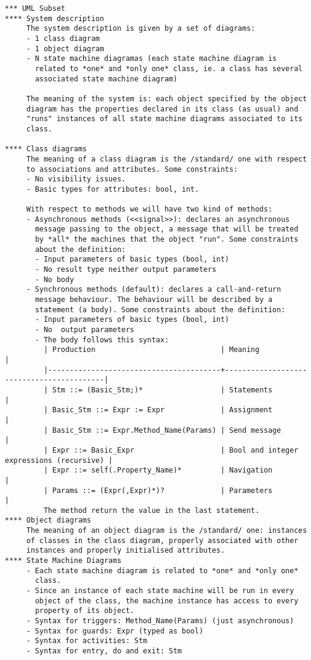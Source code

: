 \cite{Dobing:2006:UU:1125944.1125949}

\begin{verbatim}
*** UML Subset
**** System description
     The system description is given by a set of diagrams:
     - 1 class diagram
     - 1 object diagram
     - N state machine diagramas (each state machine diagram is
       related to *one* and *only one* class, ie. a class has several
       associated state machine diagram)

     The meaning of the system is: each object specified by the object
     diagram has the properties declared in its class (as usual) and
     "runs" instances of all state machine diagrams associated to its
     class.

**** Class diagrams
     The meaning of a class diagram is the /standard/ one with respect
     to associations and attributes. Some constraints:
     - No visibility issues.
     - Basic types for attributes: bool, int.

     With respect to methods we will have two kind of methods:
     - Asynchronous methods (<<signal>>): declares an asynchronous
       message passing to the object, a message that will be treated
       by *all* the machines that the object "run". Some constraints
       about the definition:
       - Input parameters of basic types (bool, int)
       - No result type neither output parameters
       - No body
     - Synchronous methods (default): declares a call-and-return
       message behaviour. The behaviour will be described by a
       statement (a body). Some constraints about the definition:
       - Input parameters of basic types (bool, int)
       - No  output parameters
       - The body follows this syntax:
         | Production                             | Meaning                                  |
         |----------------------------------------+------------------------------------------|
         | Stm ::= (Basic_Stm;)*                  | Statements                               |
         | Basic_Stm ::= Expr := Expr             | Assignment                               |
         | Basic_Stm ::= Expr.Method_Name(Params) | Send message                             |
         | Expr ::= Basic_Expr                    | Bool and integer expressions (recursive) |
         | Expr ::= self(.Property_Name)*         | Navigation                               |
         | Params ::= (Expr(,Expr)*)?             | Parameters                               |
         The method return the value in the last statement.
**** Object diagrams
     The meaning of an object diagram is the /standard/ one: instances
     of classes in the class diagram, properly associated with other
     instances and properly initialised attributes.
**** State Machine Diagrams
     - Each state machine diagram is related to *one* and *only one*
       class.
     - Since an instance of each state machine will be run in every
       object of the class, the machine instance has access to every
       property of its object.
     - Syntax for triggers: Method_Name(Params) (just asynchronous)
     - Syntax for guards: Expr (typed as bool)
     - Syntax for activities: Stm
     - Syntax for entry, do and exit: Stm


\end{verbatim}
